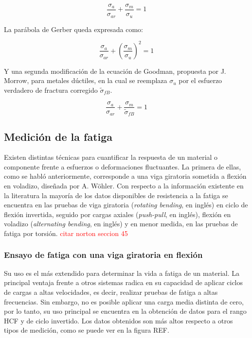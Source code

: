 \begin{equation} \label{eq:good_norm}
	\frac{\sigma_a}{\sigma_{ar}} + \frac{\sigma_m}{\sigma_u} = 1 
\end{equation}

La parábola de Gerber queda expresada como:

\begin{equation} \label{eq:par_gerber}
	\frac{\sigma_a}{\sigma_{ar}} + \left(\frac{\sigma_m}{\sigma_u}\right)^2 = 1 
\end{equation}

Y una segunda modificación de la ecuación de Goodman, propuesta por J. Morrow, para metales dúctiles, en la cual se reemplaza $\sigma_u$ por el esfuerzo verdadero de fractura corregido $\tilde{\sigma}_{fB}$.

\begin{equation} \label{eq:mod_goodduct}
	\frac{\sigma_a}{\sigma_{ar}} + \frac{\sigma_m}{\tilde{\sigma}_{fB}} = 1 
\end{equation}


\subsection{Medición de la fatiga}
Existen distintas técnicas para cuantificar la respuesta de un material o componente frente a esfuerzos o deformaciones fluctuantes. La primera de ellas, como se habló anteriormente, corresponde a una viga giratoria sometida a flexión en voladizo, diseñada por A. Wöhler. Con respecto a la información existente en la literatura la mayoría de los datos disponibles de resistencia a la fatiga se encuentra en las pruebas de viga giratoria (\textit{rotating bending}, en inglés) en ciclo de flexión invertida, seguido por cargas axiales (\textit{push-pull}, en inglés), flexión en voladizo (\textit{alternating bending}, en inglés) y en menor medida, en las pruebas de fatiga por torsión. \textcolor{red}{citar norton seccion 45}

\subsubsection{Ensayo de fatiga con una viga giratoria en flexión} 
Su uso es el más extendido para determinar la vida a fatiga de un material. La principal ventaja frente a otros sistemas radica en su capacidad de aplicar ciclos de cargas a altas velocidades, es decir, realizar pruebas de fatiga a altas frecuencias. Sin embargo, no es posible aplicar una carga media distinta de cero, por lo tanto, su uso principal se encuentra en la obtención de datos para el rango HCF y de ciclo invertido. Los datos obtenidos son más altos respecto a otros tipos de medición, como se puede ver en la figura REF.


